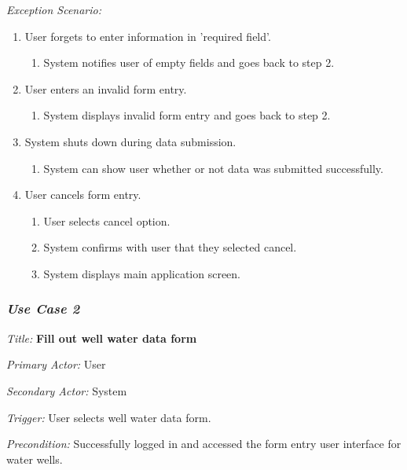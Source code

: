 \documentclass[twoside,letterpaper]{article}
\begin{document}
{\color{black} \textit{Exception Scenario:}}
\begin{enumerate}
\item User forgets to enter information in 'required field'.
\begin{enumerate}
\item System notifies user of empty fields and goes back to step 2.
\end{enumerate}

\item User enters an invalid form entry.
\begin{enumerate}
\item System displays invalid form entry and goes back to step 2.
\end{enumerate}

\item System shuts down during data submission.
\begin{enumerate}
\item System can show user whether or not data was submitted successfully. 
\end{enumerate}

\item User cancels form entry.
\begin{enumerate}
\item User selects cancel option.
\item System confirms with user that they selected cancel.
\item System displays main application screen.

\end{enumerate}
\end{enumerate}


\subsubsection{\textit{Use Case 2}} 

\textit{Title: }{\bfseries\color{black} Fill out well water data form}

{\color{black} \textit{Primary Actor:} User}

{\color{black} \textit{Secondary Actor:} System}

{\color{black} \textit{Trigger:} User selects well water data form.}

{\color{black} \textit{Precondition:} Successfully logged in and accessed the form entry user interface for water wells.}
\end{document}
